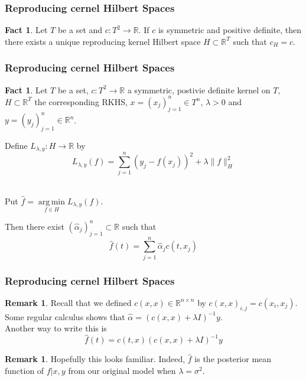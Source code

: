 \documentclass[notheorems]{beamer}
\theoremstyle{definition}
\newtheorem{fact}[definition]{Fact}
\newtheorem{rem}[definition]{Remark}
\newcommand{\al}{\alpha}
\newcommand{\lam}{\lambda}
\newcommand{\sig}{\sigma}
\newcommand{\R}{\mathbb{R}}
\DeclareMathOperator*{\argmin}{arg\,min}
\begin{document}
\begin{frame}
\frametitle{Reproducing cernel Hilbert Spaces}
\begin{fact}
Let $T$ be a set and $c : T^2 \rightarrow \R$. If $c$ is symmetric and positive definite, then there exists a unique reproducing kernel Hilbert space $H \subset \R^T$ such that $c_H = c$.
\end{fact}

\end{frame}









\begin{frame}
\frametitle{Reproducing cernel Hilbert Spaces}
\begin{fact}
Let $T$ be a set, $c : T^2 \rightarrow \R$ a symmetric, postivie definite kernel on $T$, $H \subset \R^T$ the corresponding RKHS, $x = (x_j)_{j=1}^n \in T^n$, $\lam > 0$ and $y = (y_j)_{j=1}^n \in \R^n$. \\
\pause

Define $L_{\lam, y}: H \rightarrow \R$ by $$L_{\lam, y}(f) = \sum_{j=1}^n (y_j - f(x_j) )^2 + \lam \|f\|_H^2$$ \\
\pause 

Put $\hat{f} = \argmin\limits_{f \in H}L_{\lam, y}(f)$. 
\\
\pause 

Then there exist $(\hat{\al}_j)_{j=1}^n \subset \R$ such that $$\hat{f}(t) = \sum_{j=1}^n \hat{\al}_jc(t, x_j)$$
\end{fact}
\end{frame}















\begin{frame}
\frametitle{Reproducing cernel Hilbert Spaces}
\begin{rem}
Recall that we defined $c(x,x) \in \R^{n \times n}$ by $c(x,x)_{i,j} = c(x_i, x_j)$. Some regular calculus shows that $\hat{\al} = (c(x,x) + \lam I)^{-1}y$.\\
Another way to write this is 
$$\hat{f}(t) = c(t,x)(c(x,x) + \lam I)^{-1}y$$
\end{rem}

\begin{rem}
Hopefully this looks familiar. Indeed, $\hat{f}$ is the posterior mean function of $f|x,y$ from our original model when $\lam = \sig^2$.
\end{rem}

\end{frame}
\end{document}
